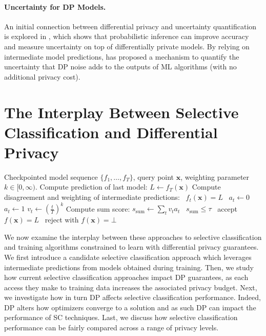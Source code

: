 \paragraph{Uncertainty for DP Models.} An initial connection between differential privacy and uncertainty quantification is explored in \citet{williams2010probabilistic}, which shows that probabilistic inference can improve accuracy and measure uncertainty on top of differentially private models. By relying on intermediate model predictions, \citet{shejwalkar2022recycling} has proposed a mechanism to quantify the uncertainty that DP noise adds to the outputs of ML algorithms (with no additional privacy cost).

\section{The Interplay Between Selective Classification and Differential Privacy}

\begin{algorithm}[t]
	\caption{\sctd~\citep{rabanser2022selective}}\label{alg:sctd}
	\begin{algorithmic}[1]
	\Require Checkpointed model sequence $\{f_1,\ldots,f_T\}$, query point $\bm{x}$, weighting parameter $k \in [0,\infty)$.
    \State Compute prediction of last model: $L \gets f_T(\bm{x})$
    \State Compute disagreement and weighting of intermediate predictions: 
        \State \algorithmicif\ $f_t(\bm{x}) = L$ \algorithmicthen\ $a_t \gets 0$ \algorithmicelse\ $a_t \gets 1$
        \State $v_t \gets (\frac{t}{T})^k$
    \EndFor
\State Compute sum score: $s_\text{sum} \gets \sum_{t} v_t a_t$
    \State \algorithmicif\ $s_\text{sum} \leq \tau$ \algorithmicthen\ accept $f(\bm{x}) = L$ \algorithmicelse\ reject with $f(\bm{x}) = \bot$
	\end{algorithmic}
\end{algorithm}

We now examine the interplay between these approaches to selective classification and training algorithms constrained to learn with differential privacy guarantees. We first introduce a candidate selective classification approach which leverages intermediate predictions from models obtained during training. Then, we study how current selective classification approaches impact DP guarantees, as each access they make to training data increases the associated privacy budget. Next, we investigate how in turn DP affects selective classification performance. Indeed, DP alters how optimizers converge to a solution and as such DP can impact the performance of SC techniques. Last, we discuss how selective classification performance can be fairly compared across a range of privacy levels.

